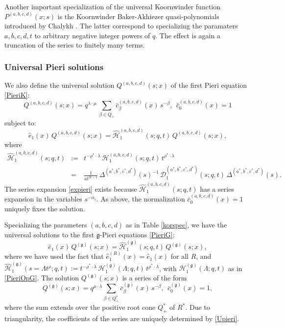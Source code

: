 \documentclass[12pt]{amsart}
\newcommand{\g}{{\mathfrak{g}}}
\newcommand{\cH}{{\mathcal{H}}}
\newcommand{\al}{{\alpha}}
\numberwithin{equation}{section}
\begin{document}
Another important specialization of the universal Koornwinder function $P^{(a,b,c,d)}(x;s)$ is the Koornwinder Baker-Akhiezer quasi-polynomials introduced by Chalykh \cite{Chalykh}. The latter correspond to specializing the paramaters $a,b,c,d,t$ to arbitrary negative integer powers of $q$. The effect is again a truncation of the series to finitely many terms. 




%
%
%
%
%
%
%
%
%
%
%
%
%
%
%
%
%
%
%
%
%
%
%
%
%
%
%
%
%
%
%
%



\subsubsection{Universal Pieri solutions}

We also define the universal solution  $Q^{(a,b,c,d)}(s;x)$ of the first Pieri equation \eqref{PieriK}:
\begin{equation}\label{expieri}
Q^{(a,b,c,d)}(s;x)=q^{\lambda\cdot\mu}\, \sum_{\beta\in Q_+} {\bar c}_\beta^{(a,b,c,d)}(x)\, s^{-\beta},\ \ {\bar c}_0^{(a,b,c,d)}(x)=1
\end{equation}
subject to:
%
$${\hat e}_1(x)\, Q^{(a,b,c,d)}(s;x)= \hat{\mathcal H}_1^{(a,b,c,d)}(s;q,t)\, Q^{(a,b,c,d)}(s;x),$$
%
where
\begin{eqnarray}
\hat{\mathcal  H}_1^{(a,b,c,d)}(s;q,t)&:=&t^{-\rho^*\cdot \lambda} \,{\mathcal H}_1^{(a,b,c,d)}(s;q,t)\, t^{\rho^*\cdot \lambda}\nonumber\\
&=&\frac{1}{a t^{N-1}}\,
\Delta^{(a^*,b^*,c^*,d^*)}(s)^{-1}\, {\mathcal D}_1^{(a^*,b^*,c^*,d^*)}(s;q,t)\,\Delta^{(a^*,b^*,c^*,d^*)}(s).\label{pieriHamabcd}
\end{eqnarray}
%
The series expansion \eqref{expieri} exists because $\hat{\mathcal H}_1^{(a,b,c,d)}(s;q,t)$
has a series expansion in the variables $s^{-\al_i}$. As above, the normalization 
${\bar c}_0^{(a,b,c,d)}(x)=1$ uniquely fixes the solution.

%
%
%

Specializing the parameters $(a,b,c,d)$ as in Table \ref{korspec}, we have the universal solutions  to 
the first $\g$-Pieri equations \eqref{PieriG}:
\begin{equation}\label{Upieri}
{\hat e}_1(x)\, Q^{(\g)}(s;x)=\hat\cH_1^{(\g)}(s;q,t)\, Q^{(\g)}(s;x),
\end{equation}
where we have used the fact that ${\hat e}_1^{(R)}(x)={\hat e}_1(x)$ for all $R$, and
$\hat\cH_1^{(\g)}(s=\Lambda t^\rho;q,t):=t^{-\rho^*\cdot \lambda}\,\cH_1^{(\g)}(\Lambda;q,t)\,t^{\rho^*\cdot \lambda}$,
with $\cH_1^{(\g)}(\Lambda;q,t)$ as in \eqref{PieriOpG}. The solution $Q^{(\g)}(s;x)$  is a series of the form
$$Q^{(\g)}(s;x) = q^{\mu\cdot\lambda} \sum_{\beta\in Q_+^*} {\bar c}_\beta^{(\g)}(x)\, s^{-\beta},\ \ {\bar c}_0^{(\g)}(x)=1,
$$
where the sum extends over the positive root cone $Q_+^*$ of $R^*$. 
Due to triangularity, the coefficients of the series are uniquely determined by \eqref{Upieri}. 
\end{document}
